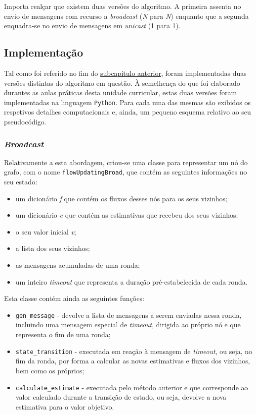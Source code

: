 \documentclass[a4paper]{article}
\begin{document}
{	Importa realçar que existem duas versões do algoritmo. A primeira assenta no envio de mensagens com recurso a \textit{broadcast} (\textit{N} para \textit{N}) enquanto que a segunda enquadra-se no envio de mensagens em \textit{unicast} (1 para 1).


	\subsection{Implementação} \label{subsec:Implementation}
	Tal como foi referido no fim do \hyperref[subsec:Concept]{subcapítulo anterior}, foram implementadas duas versões distintas do algoritmo em questão.
	À semelhença do que foi elaborado durantes as aulas práticas desta unidade curricular, estas duas versões foram implementadas na linguagem \texttt{Python}.
	Para cada uma das mesmas são exibidos os respetivos detalhes computacionais e, ainda, um pequeno esquema relativo ao seu pseudocódigo.

		\subsubsection{\textit{Broadcast}}
		Relativamente a esta abordagem, criou-se uma classe para representar um nó do grafo, com o nome \texttt{flowUpdatingBroad}, que contém as seguintes informações no seu estado:
		\begin{itemize}
			\item um dicionário \textit{f} que contém os fluxos desses nós para os seus vizinhos;
			\item um dicionário \textit{e} que contém as estimativas que recebeu dos seus vizinhos;
			\item o seu valor inicial \textit{v};
			\item a lista dos seus vizinhos;
			\item as mensagens acumuladas de uma ronda;
			\item um inteiro \textit{timeout} que representa a duração pré-estabelecida de cada ronda.
		\end{itemize}

		Esta classe contém ainda as seguintes funções:
		\begin{itemize}
			\item \texttt{gen\_message} - devolve a lista de mensagens a serem enviadas nessa ronda, incluindo uma mensagem especial de \textit{timeout}, dirigida ao próprio nó e que representa o fim de uma ronda;
			\item \texttt{state\_transition} - executada em reação à mensagem de \textit{timeout}, ou seja, no fim da ronda, por forma a calcular as novas estimativas e fluxos dos vizinhos, bem como os próprios;
			\item \texttt{calculate\_estimate} - executada pelo método anterior e que corresponde ao valor calculado durante a transição de estado, ou seja, devolve a nova estimativa para o valor objetivo.
		\end{itemize}

}
\end{document}
